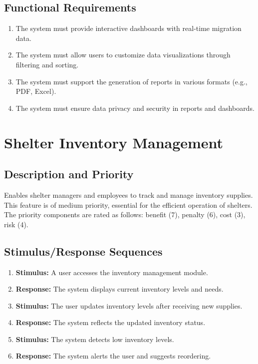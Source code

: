 \documentclass{scrreprt}
\begin{document}
\subsection{Functional Requirements}
\begin{enumerate}[resume*=func-req, leftmargin=60pt]
    \item The system must provide interactive dashboards with real-time migration data.
    \item The system must allow users to customize data visualizations through filtering and sorting.
    \item The system must support the generation of reports in various formats (e.g., PDF, Excel).
    \item The system must ensure data privacy and security in reports and dashboards.
\end{enumerate}

\section{Shelter Inventory Management}
\subsection{Description and Priority}
Enables shelter managers and employees to track and manage inventory supplies. This feature is of medium priority, essential for the efficient operation of shelters. The priority components are rated as follows: benefit (7), penalty (6), cost (3), risk (4).
\subsection{Stimulus/Response Sequences}
\begin{enumerate}
    \item \textbf{Stimulus:} A user accesses the inventory management module.
    \item \textbf{Response:} The system displays current inventory levels and needs.
    \item \textbf{Stimulus:} The user updates inventory levels after receiving new supplies.
    \item \textbf{Response:} The system reflects the updated inventory status.
    \item \textbf{Stimulus:} The system detects low inventory levels.
    \item \textbf{Response:} The system alerts the user and suggests reordering.
\end{enumerate}
\end{document}
